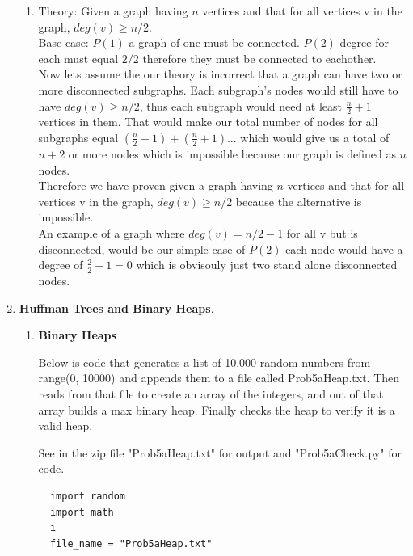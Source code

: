 \documentclass{article}
\begin{document}
\begin{enumerate}
\begin{enumerate}
      \item Theory: Given a graph having $n$ vertices and that for all vertices v in the graph, $deg(v) \geq n/2$.\\
      
      Base case: $P(1)$ a graph of one must be connected. $P(2)$ degree for each must equal $2/2$ therefore they must be connected to eachother.\\

      Now lets assume the our theory is incorrect that a graph can have two or more disconnected subgraphs. Each subgraph's nodes would still have to have $deg(v) \geq n/2$, thus each subgraph would need at least $\frac{n}{2} + 1$ vertices in them.
      That would make our total number of nodes for all subgraphs equal $(\frac{n}{2} + 1) + (\frac{n}{2} + 1) ...$ which would give us a total of $n + 2$ or more nodes which is impossible because our graph is defined as $n$ nodes.\\

      Therefore we have proven given a graph having $n$ vertices and that for all vertices v in the graph, $deg(v) \geq n/2$ because the alternative is impossible.\\

      An example of a graph where $deg(v) = n/2 -1$ for all v but is disconnected, would be our simple case of $P(2)$ each node would have a degree of $\frac{2}{2} - 1 = 0$ which is obvisouly just two stand alone disconnected nodes.
    \end{enumerate}

    \item \textbf{Huffman Trees and Binary Heaps}.
    
    \begin{enumerate}
      
      \item \textbf{Binary Heaps}
  
        Below is code that generates a list of 10,000 random numbers from range(0, 10000) and appends them to a file called Prob5aHeap.txt. 
        Then reads from that file to create an array of the integers, and out of that array builds a max binary heap. 
        Finally checks the heap to verify it is a valid heap.

        See in the zip file "Prob5aHeap.txt" for output and "Prob5aCheck.py" for code.

        \begin{lstlisting}
  import random
  import math     
  ı
  file_name = "Prob5aHeap.txt"


\end{lstlisting}
\end{enumerate}
\end{enumerate}
\end{document}

